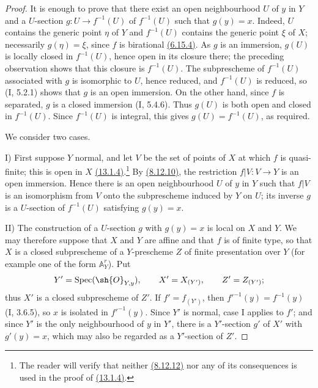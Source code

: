 \begin{proof}
It is enough to prove that there exist an open neighbourhood $U$ of
$y$ in $Y$ and a $U$-section $g:U\to f^{-1}(U)$ of $f^{-1}(U)$ such
that $g(y)=x$.  Indeed, $U$ contains the generic point $\eta$ of $Y$
and $f^{-1}(U)$ contains the generic point $\xi$ of $X$; necessarily
$g(\eta)=\xi$, since $f$ is birational {\hyperlink{ega4.c04.statement.6-15-4}{(6.15.4)}}.  As $g$ is an
immersion, $g(U)$ is locally closed in $f^{-1}(U)$, hence open in its
closure there; the preceding observation shows that this closure is
$f^{-1}(U)$.  The subprescheme of $f^{-1}(U)$ associated with $g$ is
isomorphic to $U$, hence reduced, and $f^{-1}(U)$ is reduced, so (I,
5.2.1) shows that $g$ is an open immersion.  On the other hand, since
$f$ is separated, $g$ is a closed immersion (I, 5.4.6).  Thus $g(U)$
is both open and closed in $f^{-1}(U)$.  Since $f^{-1}(U)$ is integral,
this gives $g(U)=f^{-1}(U)$, as required.

We consider two cases.

\textup{I)} First suppose $Y$ normal, and let $V$ be the set of points
of $X$ at which $f$ is quasi-finite; this is open in $X$ {\hyperlink{ega4.c04.cor.13-1-4}{(13.1.4)}}.\footnote{The
reader will verify that neither {\hyperlink{ega4.c04.cor.8-12-12}{(8.12.12)}} nor any of its consequences is
used in the proof of {\hyperlink{ega4.c04.cor.13-1-4}{(13.1.4)}}.}  By {\hyperlink{ega4.c04.cor.8-12-10}{(8.12.10)}}, the restriction
$f|V:V\to Y$ is an open immersion.  Hence there is an open
neighbourhood $U$ of $y$ in $Y$ such that $f|V$ is an isomorphism from
$V$ onto the subprescheme induced by $Y$ on $U$; its inverse $g$ is a
$U$-section of $f^{-1}(U)$ satisfying $g(y)=x$.

\textup{II)} The construction of a $U$-section $g$ with $g(y)=x$ is
local on $X$ and $Y$.  We may therefore suppose that $X$ and $Y$ are
affine and that $f$ is of finite type, so that $X$ is a closed
subprescheme of a $Y$-prescheme $Z$ of finite presentation over $Y$
(for example one of the form $\mathbb A_Y^r$).  Put
\[
 Y'=\operatorname{Spec}(\sh{O}_{Y,y}),\qquad
 X'=X_{(Y')},\qquad Z'=Z_{(Y')};
\]
thus $X'$ is a closed subprescheme of $Z'$.  If $f'=f_{(Y')}$, then
$f'^{-1}(y)=f^{-1}(y)$ (I, 3.6.5), so $x$ is isolated in
$f'^{-1}(y)$.  Since $Y'$ is normal, case I applies to $f'$; and since
$Y'$ is the only neighbourhood of $y$ in $Y'$, there is a $Y'$-section
$g'$ of $X'$ with $g'(y)=x$, which may also be regarded as a
$Y'$-section of $Z'$.


\end{proof}
